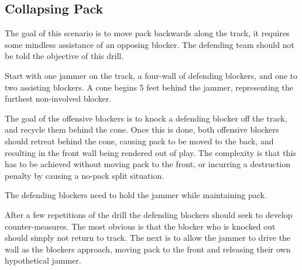 \subsection*{Collapsing Pack}
\label{sec:scenario/collapsing_pack}

The goal of this scenario is to move pack backwards along the track, it requires some mindless assistance of an opposing blocker.  
The defending team should not be told the objective of this drill.


Start with one jammer on the track, a four-wall of defending blockers, and one to two assisting blockers. 
A cone begins 5 feet behind the jammer, representing the furthest non-involved blocker. 

The goal of the offensive blockers is to knock a defending blocker off the track, and recycle them behind the cone. 
Once this is done, both offensive blockers should retreat behind the cone, causing pack to be moved to the back, and resulting in the front wall being rendered out of play. 
The complexity is that this has to be achieved without moving pack to the front, or incurring a destruction penalty by causing a no-pack split situation. 

The defending blockers need to hold the jammer while maintaining pack.  


After a few repetitions of the drill the defending blockers should seek to develop counter-measures.  
The most obvious is that the blocker who is knocked out should simply not return to track.
The next is to allow the jammer to drive the wall as the blockers approach, moving pack to the front and releasing their own hypothetical jammer.   
